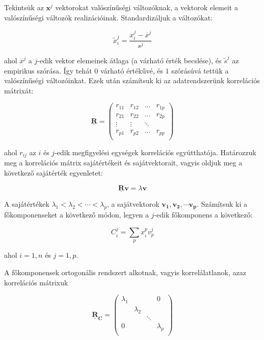 \documentclass[a4paper,12pt]{article}
\begin{document}
Tekintsük az $\mathbf{x}^j$ vektorokat valószínűségi változóknak, a vektorok elemeit a valószínűségi változók
realizációinak. Standardizáljuk a változókat:

$$ \widetilde{x}_i^j = \frac{x^j_i - \overline{x}^j}{s^j}$$

ahol $\overline{x}^j$ a $j$-edik vektor elemeinek átlaga (a várható érték becslése), és $\widetilde{s}^j$ az
empirikus szórása. Így tehát $0$ várható értékűvé, és $1$ szórásúvá tettük a valószínűségi változóinkat. Ezek után számítsuk ki az adatrendszerünk korrelációs mátrixát:

\begin{displaymath}
\mathbf{\underline{R}} =
\left (\begin{array}{cccc}
r_{11} & r_{12} & \ldots & r_{1p}\\
r_{21} & r_{22} & \ldots & r_{2p}\\
\vdots & \vdots & \ddots \\
r_{p1} & r_{p2} & \ldots & r_{pp} \\
\end{array} \right)
\end{displaymath}

ahol $r_{ij}$ az $i$ és $j$-edik megfigyelési egységek korrelációs együtthatója. Határozzuk meg a korrelációs mátrix sajátértékeit és sajátvektorait, vagyis oldjuk meg a következő sajátérték  egyenletet:

$$\mathbf{\underline{R} v} = \lambda \mathbf{v}$$

A sajátértékek $\lambda_1<\lambda_2<\cdots<\lambda_p$, a sajátvektorok 
$\mathbf{v_1, v_2, \cdots v_p}$.
Számítsuk ki a főkomponenseket a következő módon, legyen a $j$-edik főkomponens a következő:

$$C_i^j = \sum_p x_i^p v_p^j$$

ahol $i=1,n$ és $j=1,p$.

A főkomponensek ortogonális rendszert alkotnak, vagyis korrelálatlanok, azaz korrelációs mátrixuk

\begin{displaymath}
\mathbf{\underline{R}_C} =
\left (\begin{array}{cccc}
\lambda_1 &  &  & 0\\
& \lambda_2 &  & \\
&  & \ddots \\
0  &  & & \lambda_p \\
\end{array} \right)
\end{displaymath}
\end{document}
